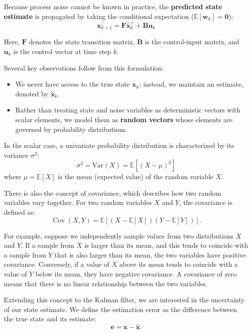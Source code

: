 \documentclass{article}
\begin{document}
	Because process noise cannot be known in practice, the \textbf{predicted state estimate} is propagated by taking the conditional expectation ($\mathbb{E}[\mathbf{w}_{k}] = \mathbf{0}$):
	\begin{equation}
		\hat{\mathbf{x}}_{k+1}^- = \mathbf{F} \hat{\mathbf{x}}_{k}^+ + \mathbf{B} \mathbf{u}_{k}
		\label{eq:estimated_state_prop}
	\end{equation}
	
	Here, $\mathbf{F}$ denotes the state transition matrix, $\mathbf{B}$ is the control-input matrix, and $\mathbf{u}_{k}$ is the control vector at time step $k$.
	
	Several key observations follow from this formulation:
	\begin{itemize}
		\item We never have access to the true state $\mathbf{x}_{k}$; instead, we maintain an estimate, denoted by $\hat{\mathbf{x}}_{k}$.
		\item Rather than treating state and noise variables as deterministic vectors with scalar elements, we model them as \textbf{random vectors} whose elements are governed by probability distributions.
	\end{itemize}
	
	In the scalar case, a univariate probability distribution is characterized by its variance $\sigma^2$:
	\[
	\sigma^2 = \text{Var}(X) = \mathbb{E}\left[(X - \mu)^2\right]
	\]
	where $\mu = \mathbb{E}[X]$ is the mean (expected value) of the random variable $X$. 
	
	There is also the concept of covariance, which describes how two random variables vary together. For two random variables $X$ and $Y$, the covariance is defined as:
	\[
	\operatorname{Cov}(X,Y) = \mathbb{E}\left[(X-\mathbb{E}[X])(Y-\mathbb{E}[Y])\right].
	\]
	
	For example, suppose we independently sample values from two distributions $X$ and $Y$. If a sample from $X$ is larger than its mean, and this tends to coincide with a sample from $Y$ that is also larger than its mean, the two variables have positive covariance. Conversely, if a value of $X$ above its mean tends to coincide with a value of $Y$ below its mean, they have negative covariance. A covariance of zero means that there is no linear relationship between the two variables.
	
	Extending this concept to the Kalman filter, we are interested in the uncertainty of our state estimate. We define the estimation error as the difference between the true state and its estimate:
	\[
	\mathbf{e} = \mathbf{x} - \hat{\mathbf{x}}.
	\]
	
\end{document}
